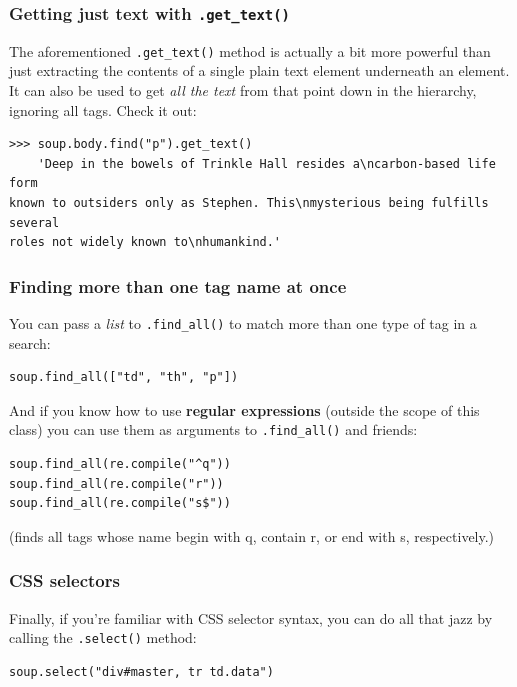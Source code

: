 \subsubsection{Getting just text with \texttt{.get\_text()}}

The aforementioned \texttt{.get\_text()} method is actually a bit more
powerful than just extracting the contents of a single plain text element
underneath an element. It can also be used to get \textit{all the text} from
that point down in the hierarchy, ignoring all tags. Check it out:

\begin{Verbatim}[fontsize=\footnotesize,samepage=true,frame=single]
>>> soup.body.find("p").get_text()
    'Deep in the bowels of Trinkle Hall resides a\ncarbon-based life form
known to outsiders only as Stephen. This\nmysterious being fulfills several
roles not widely known to\nhumankind.'
\end{Verbatim}

\subsubsection{Finding more than one tag name at once}

You can pass a \textit{list} to \texttt{.find\_all()} to match more than one
type of tag in a search:

\begin{Verbatim}[fontsize=\footnotesize,samepage=true,frame=single]
soup.find_all(["td", "th", "p"])
\end{Verbatim}

And if you know how to use \textbf{regular expressions} (outside the scope of
this class) you can use them as arguments to \texttt{.find\_all()} and
friends:

\begin{Verbatim}[fontsize=\footnotesize,samepage=true,frame=single]
soup.find_all(re.compile("^q"))
soup.find_all(re.compile("r"))
soup.find_all(re.compile("s$"))
\end{Verbatim}

(finds all tags whose name begin with q, contain r, or end with s,
respectively.)

\subsubsection{CSS selectors}

Finally, if you're familiar with CSS selector syntax, you can do all that jazz
by calling the \texttt{.select()} method:

\begin{Verbatim}[fontsize=\footnotesize,samepage=true,frame=single]
soup.select("div#master, tr td.data")
\end{Verbatim}


